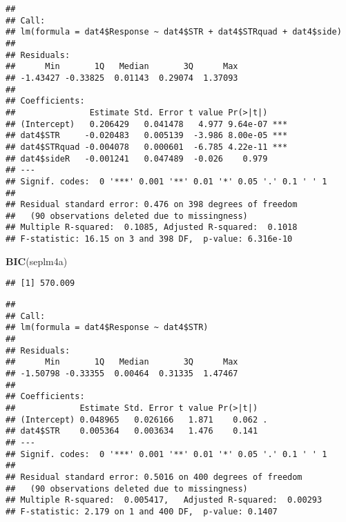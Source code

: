 \documentclass[
]{article}
\newenvironment{Shaded}{\begin{snugshade}}{\end{snugshade}}
\newcommand{\KeywordTok}[1]{\textcolor[rgb]{0.13,0.29,0.53}{\textbf{#1}}}
\newcommand{\NormalTok}[1]{#1}
\newcommand{\OperatorTok}[1]{\textcolor[rgb]{0.81,0.36,0.00}{\textbf{#1}}}
\newcommand{\StringTok}[1]{\textcolor[rgb]{0.31,0.60,0.02}{#1}}
\begin{document}
\begin{verbatim}
## 
## Call:
## lm(formula = dat4$Response ~ dat4$STR + dat4$STRquad + dat4$side)
## 
## Residuals:
##      Min       1Q   Median       3Q      Max 
## -1.43427 -0.33825  0.01143  0.29074  1.37093 
## 
## Coefficients:
##               Estimate Std. Error t value Pr(>|t|)    
## (Intercept)   0.206429   0.041478   4.977 9.64e-07 ***
## dat4$STR     -0.020483   0.005139  -3.986 8.00e-05 ***
## dat4$STRquad -0.004078   0.000601  -6.785 4.22e-11 ***
## dat4$sideR   -0.001241   0.047489  -0.026    0.979    
## ---
## Signif. codes:  0 '***' 0.001 '**' 0.01 '*' 0.05 '.' 0.1 ' ' 1
## 
## Residual standard error: 0.476 on 398 degrees of freedom
##   (90 observations deleted due to missingness)
## Multiple R-squared:  0.1085, Adjusted R-squared:  0.1018 
## F-statistic: 16.15 on 3 and 398 DF,  p-value: 6.316e-10
\end{verbatim}

\begin{Shaded}
\begin{Highlighting}[]
\KeywordTok{BIC}\NormalTok{(seplm4a)}
\end{Highlighting}
\end{Shaded}

\begin{verbatim}
## [1] 570.009
\end{verbatim}

\begin{Shaded}
\end{Shaded}

\begin{verbatim}
## 
## Call:
## lm(formula = dat4$Response ~ dat4$STR)
## 
## Residuals:
##      Min       1Q   Median       3Q      Max 
## -1.50798 -0.33355  0.00464  0.31335  1.47467 
## 
## Coefficients:
##             Estimate Std. Error t value Pr(>|t|)  
## (Intercept) 0.048965   0.026166   1.871    0.062 .
## dat4$STR    0.005364   0.003634   1.476    0.141  
## ---
## Signif. codes:  0 '***' 0.001 '**' 0.01 '*' 0.05 '.' 0.1 ' ' 1
## 
## Residual standard error: 0.5016 on 400 degrees of freedom
##   (90 observations deleted due to missingness)
## Multiple R-squared:  0.005417,   Adjusted R-squared:  0.00293 
## F-statistic: 2.179 on 1 and 400 DF,  p-value: 0.1407
\end{verbatim}
\end{document}
